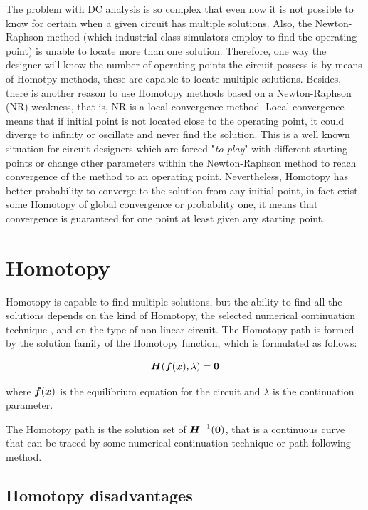 \documentclass[conference,letterpaper,onecolumn]{IEEEtran}
\newcommand{\pig}[1]{\mbox{\boldmath ${#1}$}	}
\begin{document}
The problem with DC analysis is so complex that even now it is not possible to know for certain when a given circuit has multiple solutions. Also, the Newton-Raphson method (which industrial class simulators employ to find the operating point) is unable to locate more than one solution. Therefore, one way the designer will know the number of operating points the circuit possess is by means of Homotpy methods, these are capable to locate multiple solutions. Besides, there is another reason to use Homotopy methods based on a Newton-Raphson (NR) weakness, that is, NR is a local convergence method. Local convergence means that if initial point is not located close to the operating point, it could diverge to infinity or oscillate and never find the solution. This is a well known situation for circuit designers which are forced "{\it to play}" with different starting points or change other parameters within the Newton-Raphson method to reach convergence of the method to an operating point. Nevertheless, Homotopy has better probability to converge to the solution from any initial point, in fact exist some Homotopy of global convergence or probability one\cite{homo_zeroes,homo_coercitivo}, it means that convergence is guaranteed for one point at least given any starting point.


\section{Homotopy}

Homotopy is capable to find multiple solutions, but the ability to find all the solutions depends on the kind of Homotopy, the selected numerical continuation technique \cite{homo_iberchip03}, and on the type of non-linear circuit. The Homotopy path is formed by the solution family of the Homotopy function, which is formulated as follows:

\begin{equation}
\pig{H}(\pig{f}(\pig{x}),\lambda )=\pig{0}
\label{homotopia}
\end{equation}

where  $\pig{f}(\pig{x})$ is the equilibrium equation for the circuit and $\lambda$ is the continuation parameter. 

The Homotopy path is the solution set of $\pig{H}^{-1}(\pig{0})$, that is a continuous curve that can be traced by some numerical continuation technique or path following method.

\subsection{Homotopy disadvantages}
\end{document}
